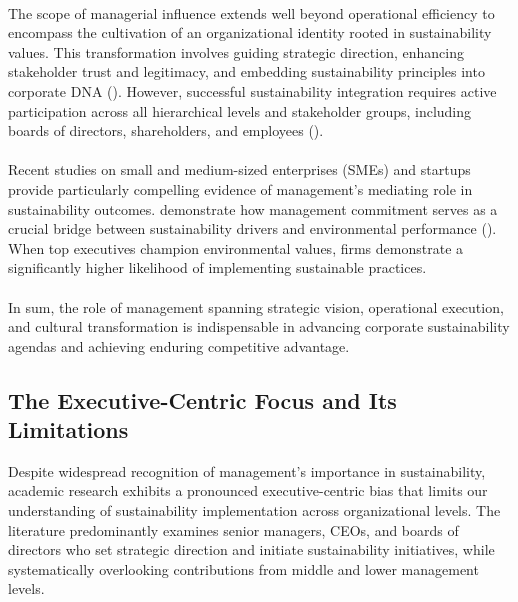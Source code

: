 	\paragraph*{} The scope of managerial influence extends well beyond operational efficiency to encompass the cultivation of an organizational identity rooted in sustainability values. This transformation involves guiding strategic direction, enhancing stakeholder trust and legitimacy, and embedding sustainability principles into corporate DNA (\textcite{Eccles2014, Dyllick2016}). However, successful sustainability integration requires active participation across all hierarchical levels and stakeholder groups, including boards of directors, shareholders, and employees (\textcite{Freeman1984}).
	
	\paragraph*{} Recent studies on small and medium-sized enterprises (SMEs) and startups provide particularly compelling evidence of management’s mediating role in sustainability outcomes. \citeauthor{Madrid2023, Memon2022} demonstrate how management commitment serves as a crucial bridge between sustainability drivers and environmental performance (\textcite{Madrid2023, Memon2022}). When top executives champion environmental values, firms demonstrate a significantly higher likelihood of implementing sustainable practices.
	
	\paragraph*{} In sum, the role of management spanning strategic vision, operational execution, and cultural transformation is indispensable in advancing corporate sustainability agendas and achieving enduring competitive advantage.
	
	\subsection{The Executive-Centric Focus and Its Limitations}
	Despite widespread recognition of management's importance in sustainability, academic research exhibits a pronounced executive-centric bias that limits our understanding of sustainability implementation across organizational levels. The literature predominantly examines senior managers, CEOs, and boards of directors who set strategic direction and initiate sustainability initiatives, while systematically overlooking contributions from middle and lower management levels.
	
